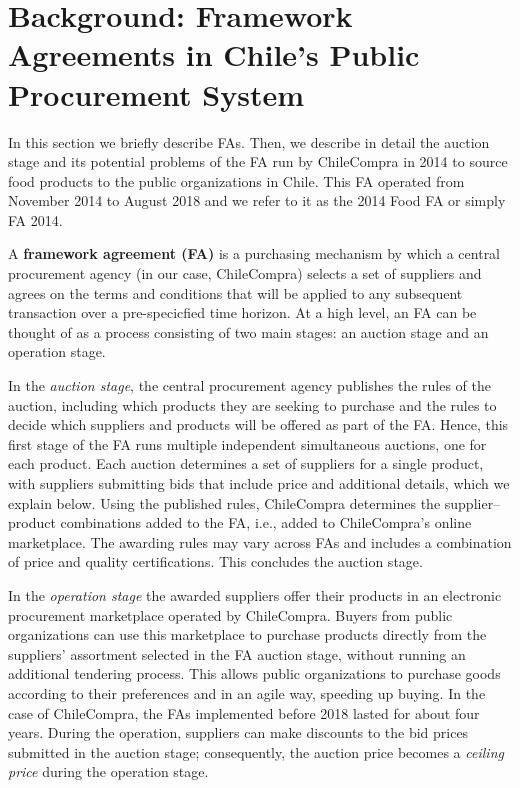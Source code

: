 \section{Background: Framework Agreements in Chile's Public Procurement System}

In this section we briefly describe FAs. Then, we describe in detail the auction stage and its potential problems of the FA run by ChileCompra in 2014 to source food products to the public organizations in Chile. This FA operated from November 2014 to August 2018 and we refer to it as the 2014 Food FA or simply FA 2014.



%


A {\bf framework agreement (FA)} is a purchasing mechanism by which a central procurement agency (in our case, ChileCompra) selects a set of suppliers and agrees on the terms and conditions that will be applied to any subsequent transaction over a pre-specicfied time horizon.
At a high level, an FA can be thought of as a process consisting of two main stages: an auction stage and an operation stage. %


In the \emph{auction stage}, the central procurement agency publishes the rules of the auction, including which products they are seeking to purchase and the rules to decide which suppliers and products will be offered as part of the FA. {Hence, this first stage of the FA runs multiple independent simultaneous auctions, one for each product. Each auction determines a set of suppliers for a single product, with suppliers submitting bids that include price and additional details, which we explain below.} Using the published rules, ChileCompra determines the supplier--product combinations added to the FA, i.e., added to ChileCompra's online marketplace. The awarding rules may vary across FAs and includes a combination of price and quality certifications. This concludes the auction stage. 

In the \emph{operation stage} the awarded suppliers offer their products in an electronic procurement marketplace operated by ChileCompra. Buyers from public organizations can use this marketplace to purchase products directly from the suppliers' assortment selected in the FA auction stage, without running an additional tendering process. This allows public organizations to purchase goods according to their preferences and in an agile way, speeding up buying. In the case of ChileCompra, the FAs implemented before 2018 lasted for about four years.  During the operation, suppliers can make discounts to the bid prices submitted in the auction stage; consequently, the auction price becomes a \textit{ceiling price} during the operation stage.


